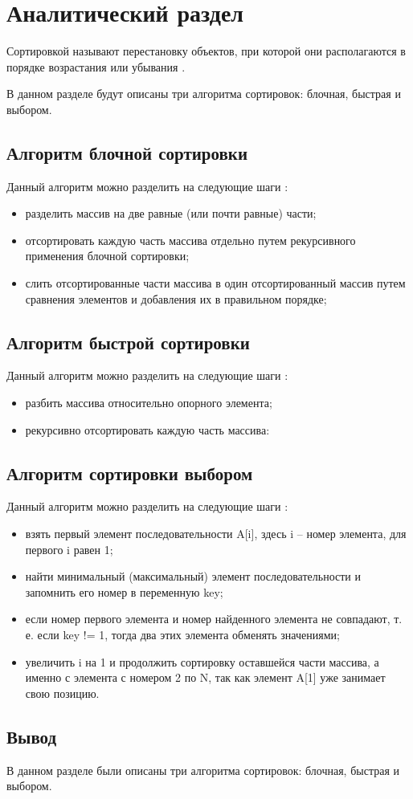 \chapter{Аналитический раздел}

Сортировкой называют перестановку объектов, при которой они располагаются в порядке возрастания или убывания \cite{knut}.

В данном разделе будут описаны три алгоритма сортировок: блочная, быстрая и выбором.

\section{Алгоритм блочной сортировки}
Данный алгоритм можно разделить на следующие шаги \cite{blocksort}:

\begin{itemize}
	\item разделить массив на две равные (или почти равные) части;
	\item отсортировать каждую часть массива отдельно путем рекурсивного применения блочной сортировки;
	\item слить отсортированные части массива в один отсортированный массив путем сравнения элементов и добавления их в правильном порядке;
\end{itemize}


\section{Алгоритм быстрой сортировки}
Данный алгоритм можно разделить на следующие шаги \cite{quicksort}:

\begin{itemize}
	\item разбить массива относительно опорного элемента;
	\item рекурсивно отсортировать каждую часть массива:
\end{itemize}


\section{Алгоритм сортировки выбором}
Данный алгоритм можно разделить на следующие шаги \cite{selectionsort}:

\begin{itemize}
	\item взять первый элемент последовательности A[i], здесь i – номер элемента, для первого i равен 1;
	\item найти минимальный (максимальный) элемент последовательности и запомнить его номер в переменную key;
	\item если номер первого элемента и номер найденного элемента не совпадают, т. е. если key != 1, тогда два этих элемента обменять значениями;
	\item увеличить i на 1 и продолжить сортировку оставшейся части массива, а именно с элемента с номером 2 по N, так как элемент A[1] уже занимает свою позицию.
\end{itemize}


\section*{Вывод}

В данном разделе были описаны три алгоритма сортировок: блочная, быстрая и выбором.
